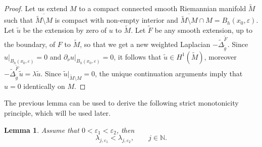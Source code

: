 \documentclass[12pt,a4paper]{amsart}
\numberwithin{equation}{section}
\theoremstyle{plain}
\newtheorem{lemma}[theorem]{Lemma}
\theoremstyle{definition}
\begin{document}
	\begin{proof}
		Let us extend $M$ to a compact connected smooth Riemannian manifold $\widetilde{M} $ such that $\overline{\widetilde{M}\setminus M}$ is compact with non-empty interior and $\overline{\widetilde{M}\setminus M} \cap M = B_h(x_0,\varepsilon)$. Let $\widetilde{u}$ be the extension by zero of $u$ to $\widetilde{M}$. Let $\widetilde{F}$ be any smooth extension, up to the boundary, of $F$ to $\widetilde{M}$, so that we get a new weighted Laplacian $-\widetilde{\Delta}_{\widetilde{g}}^{\widetilde{F}}$. Since $u\left.\right|_{B_h(x_0,\varepsilon)} = 0$ and  $\partial_{\nu}u\left.\right|_{B_h(x_0,\varepsilon)} = 0$, it follows that $\widetilde{u} \in H^1(\widetilde{M})$, moreover $-\widetilde{\Delta}_{\widetilde{g}}^{\widetilde{F}} \widetilde{u} = \lambda \widetilde{u}$. Since $\widetilde{u}\left.\right|_{\widetilde{M}\setminus M} = 0$, the unique continuation arguments imply that $u=0$ identically on $M$.
	\end{proof}
	The previous lemma can be used to derive the following strict monotonicity principle, which will be used later.
	\begin{lemma}\label{str manaton}
		Assume that $0< \varepsilon_1 < \varepsilon_2$, then 
		\begin{equation*}
			\lambda_{j,\varepsilon_1} < \lambda_{j,\varepsilon_2}, \qquad j\in \mathbb{N}.
		\end{equation*}
		
\end{lemma}
\end{document}
